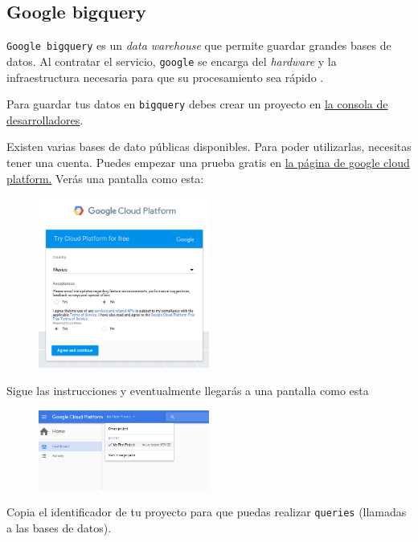 \documentclass[]{article}
\begin{document}
\subsection{Google bigquery}\label{google-bigquery}

\texttt{Google\ bigquery} es un \emph{data warehouse} que permite
guardar grandes bases de datos. Al contratar el servicio,
\texttt{google} se encarga del \emph{hardware} y la infraestructura
necesaria para que su procesamiento sea rápido
\parencite{whatisbigquery}.

Para guardar tus datos en \texttt{bigquery} debes crear un proyecto en
\href{https://console.developers.google.com/apis/library}{la consola de
desarrolladores}.

Existen varias bases de dato públicas disponibles. Para poder
utilizarlas, necesitas tener una cuenta. Puedes empezar una prueba
gratis en \href{https://cloud.google.com/free-trial/}{la página de
google cloud platform.} Verás una pantalla como esta:

\begin{figure}[H]
\centering
\includegraphics[width=0.5\textwidth]{../img/bq1.png}
\end{figure}

Sigue las instrucciones y eventualmente llegarás a una pantalla como
esta

\begin{figure}[H]
\centering
\includegraphics[width=0.5\textwidth]{../img/bq2.png}
\end{figure}

Copia el identificador de tu proyecto para que puedas realizar
\texttt{queries} (llamadas a las bases de datos).
\end{document}
